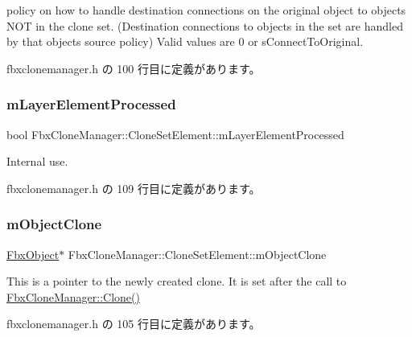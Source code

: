 policy on how to handle destination connections on the original object to objects N\+OT in the clone set. (Destination connections to objects in the set are handled by that object\textquotesingle{}s source policy) Valid values are 0 or s\+Connect\+To\+Original. 

 fbxclonemanager.\+h の 100 行目に定義があります。

\mbox{\label{struct_fbx_clone_manager_1_1_clone_set_element_a496dc6c392d9e9db4ef65094bd03d0e5}} 
\subsubsection{\texorpdfstring{m\+Layer\+Element\+Processed}{mLayerElementProcessed}}
{\footnotesize\ttfamily bool Fbx\+Clone\+Manager\+::\+Clone\+Set\+Element\+::m\+Layer\+Element\+Processed}

Internal use. 

 fbxclonemanager.\+h の 109 行目に定義があります。

\mbox{\label{struct_fbx_clone_manager_1_1_clone_set_element_a05f2720efbbcf01591be1f0c770d1004}} 
\subsubsection{\texorpdfstring{m\+Object\+Clone}{mObjectClone}}
{\footnotesize\ttfamily \hyperlink{class_fbx_object}{Fbx\+Object}$\ast$ Fbx\+Clone\+Manager\+::\+Clone\+Set\+Element\+::m\+Object\+Clone}

This is a pointer to the newly created clone. It is set after the call to \hyperlink{class_fbx_clone_manager_a2fd72cbf71c6dd3105310445c1a7c2b1}{Fbx\+Clone\+Manager\+::\+Clone()} 

 fbxclonemanager.\+h の 105 行目に定義があります。

